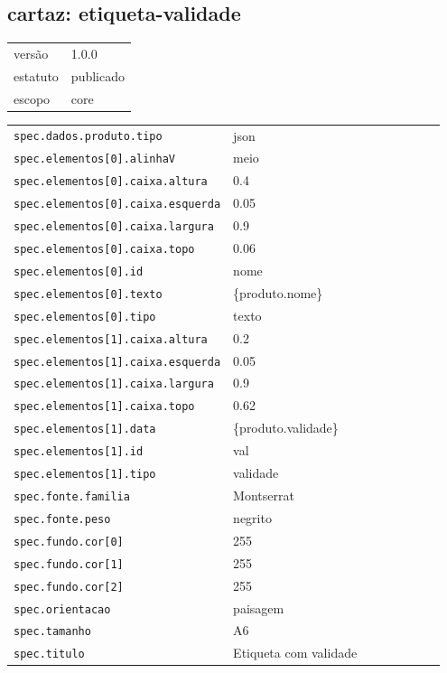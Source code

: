 \subsection*{cartaz: etiqueta-validade}
\begin{tabular}{@{}ll@{}}
versão & 1.0.0 \\
estatuto & publicado \\
escopo & core \\
\end{tabular}

\begin{tabular}{@{}p{0.35\linewidth}p{0.6\linewidth}@{}}
\texttt{spec.dados.produto.tipo} & json \\
\texttt{spec.elementos[0].alinhaV} & meio \\
\texttt{spec.elementos[0].caixa.altura} & 0.4 \\
\texttt{spec.elementos[0].caixa.esquerda} & 0.05 \\
\texttt{spec.elementos[0].caixa.largura} & 0.9 \\
\texttt{spec.elementos[0].caixa.topo} & 0.06 \\
\texttt{spec.elementos[0].id} & nome \\
\texttt{spec.elementos[0].texto} & \{produto.nome\} \\
\texttt{spec.elementos[0].tipo} & texto \\
\texttt{spec.elementos[1].caixa.altura} & 0.2 \\
\texttt{spec.elementos[1].caixa.esquerda} & 0.05 \\
\texttt{spec.elementos[1].caixa.largura} & 0.9 \\
\texttt{spec.elementos[1].caixa.topo} & 0.62 \\
\texttt{spec.elementos[1].data} & \{produto.validade\} \\
\texttt{spec.elementos[1].id} & val \\
\texttt{spec.elementos[1].tipo} & validade \\
\texttt{spec.fonte.familia} & Montserrat \\
\texttt{spec.fonte.peso} & negrito \\
\texttt{spec.fundo.cor[0]} & 255 \\
\texttt{spec.fundo.cor[1]} & 255 \\
\texttt{spec.fundo.cor[2]} & 255 \\
\texttt{spec.orientacao} & paisagem \\
\texttt{spec.tamanho} & A6 \\
\texttt{spec.titulo} & Etiqueta com validade \\
\end{tabular}
